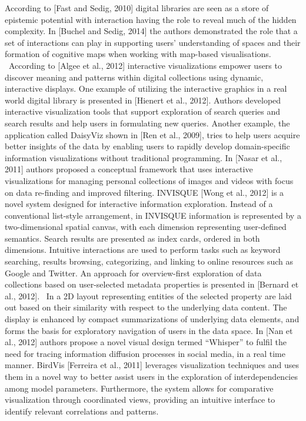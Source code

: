 \documentclass[amsthm,ebook]{saparticle}
\begin{document}
According to [Fast and Sedig, 2010] digital libraries are seen as a store of epistemic potential with interaction having
the role to reveal much of the hidden complexity. In [Buchel and Sedig, 2014] the authors demonstrated the role that a
set of interactions can play in supporting users' understanding of spaces and their formation of cognitive maps when
working with map-based visualisations. \ According to [Algee et al., 2012] interactive visualizations empower users to
discover meaning and patterns within digital collections using dynamic, interactive displays. One example of utilizing
the interactive graphics in a real world digital library is presented in [Hienert et al., 2012]. Authors developed
interactive visualization tools that support exploration of search queries and search results and help users in
formulating new queries. Another example, the application called DaisyViz shown in [Ren et al., 2009], tries to help
users acquire better insights of the data by enabling users to rapidly develop domain-specific information
visualizations without traditional programming. In [Nasar et al., 2011] authors proposed a conceptual framework that
uses interactive visualizations for managing personal collections of images and videos with focus on data re-finding
and improved filtering. INVISQUE [Wong et al., 2012] is a novel system designed for interactive information
exploration. Instead of a conventional list-style arrangement, in INVISQUE information is represented by a
two-dimensional spatial canvas, with each dimension representing user-defined semantics. Search results are presented
as index cards, ordered in both dimensions. Intuitive interactions are used to perform tasks such as keyword searching,
results browsing, categorizing, and linking to online resources such as Google and Twitter. An approach for
overview-first exploration of data collections based on user-selected metadata properties is presented in [Bernard et
al., 2012]. \ In a 2D layout representing entities of the selected property are laid out based on their similarity with
respect to the underlying data content. The display is enhanced by compact summarizations of underlying data elements,
and forms the basis for exploratory navigation of users in the data space. In [Nan et al., 2012] authors propose a
novel visual design termed “Whisper” to fulfil the need for tracing information diffusion processes in social media, in
a real time manner. BirdVis [Ferreira et al., 2011] leverages visualization techniques and uses them in a novel way to
better assist users in the exploration of interdependencies among model parameters. Furthermore, the system allows for
comparative visualization through coordinated views, providing an intuitive interface to identify relevant correlations
and patterns. 
\end{document}
